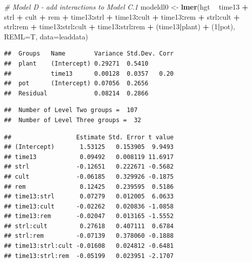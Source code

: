\documentclass[
]{krantz}
\newenvironment{Shaded}{\begin{snugshade}}{\end{snugshade}}
\newcommand{\CommentTok}[1]{\textcolor[rgb]{0.37,0.37,0.37}{\textit{#1}}}
\newcommand{\DataTypeTok}[1]{\textcolor[rgb]{0.27,0.27,0.27}{#1}}
\newcommand{\DecValTok}[1]{\textcolor[rgb]{0.06,0.06,0.06}{#1}}
\newcommand{\KeywordTok}[1]{\textcolor[rgb]{0.27,0.27,0.27}{\textbf{#1}}}
\newcommand{\NormalTok}[1]{#1}
\newcommand{\OperatorTok}[1]{\textcolor[rgb]{0.43,0.43,0.43}{\textbf{#1}}}
\newcommand{\StringTok}[1]{\textcolor[rgb]{0.5,0.5,0.5}{#1}}
\begin{document}
\begin{Shaded}
\begin{Highlighting}[]
\CommentTok{# Model D - add interactions to Model C.1}
\NormalTok{modeldl0 <-}\StringTok{ }\KeywordTok{lmer}\NormalTok{(hgt }\OperatorTok{~}\StringTok{ }\NormalTok{time13 }\OperatorTok{+}\StringTok{ }\NormalTok{strl }\OperatorTok{+}\StringTok{ }\NormalTok{cult }\OperatorTok{+}\StringTok{ }\NormalTok{rem }\OperatorTok{+}\StringTok{ }
\StringTok{  }\NormalTok{time13}\OperatorTok{:}\NormalTok{strl }\OperatorTok{+}\StringTok{ }\NormalTok{time13}\OperatorTok{:}\NormalTok{cult }\OperatorTok{+}\StringTok{ }\NormalTok{time13}\OperatorTok{:}\NormalTok{rem }\OperatorTok{+}\StringTok{ }\NormalTok{strl}\OperatorTok{:}\NormalTok{cult }\OperatorTok{+}\StringTok{ }
\StringTok{  }\NormalTok{strl}\OperatorTok{:}\NormalTok{rem }\OperatorTok{+}\StringTok{ }\NormalTok{time13}\OperatorTok{:}\NormalTok{strl}\OperatorTok{:}\NormalTok{cult }\OperatorTok{+}\StringTok{ }\NormalTok{time13}\OperatorTok{:}\NormalTok{strl}\OperatorTok{:}\NormalTok{rem }\OperatorTok{+}
\StringTok{  }\NormalTok{(time13}\OperatorTok{|}\NormalTok{plant) }\OperatorTok{+}\StringTok{ }\NormalTok{(}\DecValTok{1}\OperatorTok{|}\NormalTok{pot), }\DataTypeTok{REML=}\NormalTok{T, }\DataTypeTok{data=}\NormalTok{leaddata)}
\end{Highlighting}
\end{Shaded}

\begin{verbatim}
##  Groups   Name        Variance Std.Dev. Corr
##  plant    (Intercept) 0.29271  0.5410       
##           time13      0.00128  0.0357   0.20
##  pot      (Intercept) 0.07056  0.2656       
##  Residual             0.08214  0.2866
\end{verbatim}

\begin{verbatim}
##  Number of Level Two groups =  107 
##  Number of Level Three groups =  32
\end{verbatim}

\begin{verbatim}
##                  Estimate Std. Error t value
## (Intercept)       1.53125   0.153905  9.9493
## time13            0.09492   0.008119 11.6917
## strl             -0.12651   0.222671 -0.5682
## cult             -0.06185   0.329926 -0.1875
## rem               0.12425   0.239595  0.5186
## time13:strl       0.07279   0.012005  6.0633
## time13:cult      -0.02262   0.020836 -1.0858
## time13:rem       -0.02047   0.013165 -1.5552
## strl:cult         0.27618   0.407111  0.6784
## strl:rem         -0.07139   0.378060 -0.1888
## time13:strl:cult -0.01608   0.024812 -0.6481
## time13:strl:rem  -0.05199   0.023951 -2.1707
\end{verbatim}
\end{document}
